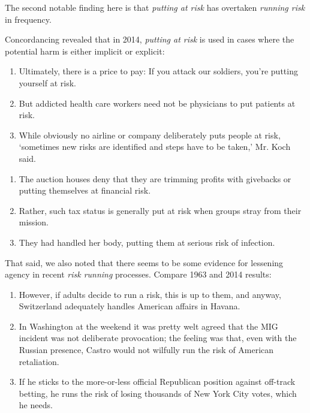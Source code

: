     The second notable finding here is that \emph{putting at risk} has overtaken \emph{running risk} in frequency.

    Concordancing revealed that in 2014, \emph{putting at risk} is used in cases where the potential harm is either implicit or explicit:

    \begin{enumerate}  [before=\itshape,font=\normalfont] \setlength\itemsep{0em} \small
    \item Ultimately, there is a price to pay: If you attack our soldiers, you're putting yourself at risk.
    \item But addicted health care workers need not be physicians to put patients at risk.
    \item While obviously no airline or company deliberately puts people at risk, `sometimes new risks are identified and steps have to be taken,' Mr. Koch said.
    \end{enumerate}

    \begin{enumerate}  [before=\itshape,font=\normalfont] \setlength\itemsep{0em} \small
    \item The auction houses deny that they are trimming profits with givebacks or putting themselves at financial risk.
    \item Rather, such tax status is generally put at risk when groups stray from their mission.
    \item They had handled her body, putting them at serious risk of infection.
    \end{enumerate}

    That said, we also noted that there seems to be some evidence for lessening agency in recent \emph{risk running} processes. Compare 1963 and 2014 results:

    \begin{enumerate} [before=\itshape,font=\normalfont]  \setlength\itemsep{0em} \small
    \item However, if adults decide to run a risk, this is up to them, and anyway, Switzerland adequately handles American affairs in Havana.
    \item In Washington at the weekend it was pretty welt agreed that the MIG incident was not deliberate provocation; the feeling was that, even with the Russian presence, Castro would not wilfully run the risk of American retaliation.
    \item  If he sticks to the more-or-less official Republican position against off-track betting, he runs the risk of losing thousands of New York City votes, which he needs.
    \end{enumerate}

